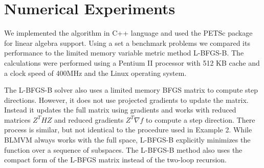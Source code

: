 \section{Numerical Experiments}

We implemented the algorithm in C++ language and used the PETSc
\cite{petsc,petsc-efficient,PETSc-user-ref}
package for linear algebra support.
Using a set a benchmark problems we compared its performance
to the limited memory variable metric method L-BFGS-B\cite{Byrd:1995:LMA}.
The calculations were performed using a Pentium II processor with 
512 KB cache and a clock speed of 400MHz and the Linux operating system.


The L-BFGS-B solver also uses a limited memory BFGS matrix to compute
step directions.  However, it does not use projected gradients to update the
matrix.  Instead it updates the full matrix using gradients and
works with reduced matrices $Z^T H Z$ and reduced gradients $Z^T \nabla f$
to compute a step direction.
There process is similar, but not identical
to the procedure used in Example 2.
While BLMVM always works with the full space, L-BFGS-B explicitly
minimizes the function over a sequence of subspaces.
The L-BFGS-B method also uses the compact form of the L-BFGS matrix instead
of the two-loop recursion.




